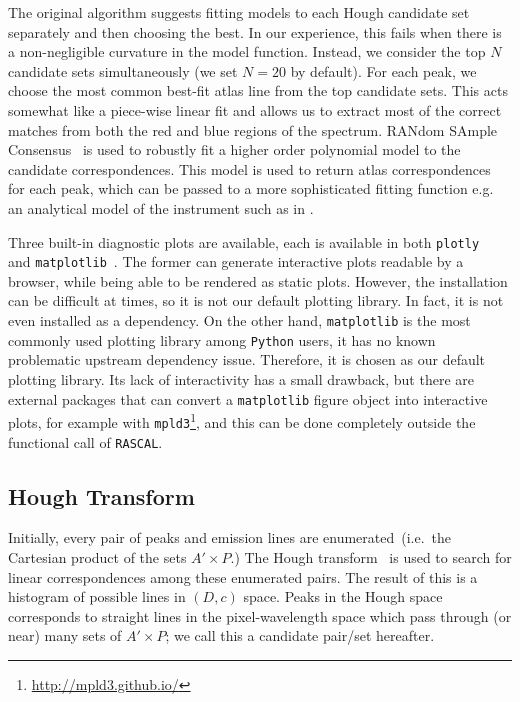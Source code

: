 \documentclass{aa}
\begin{document}
The original algorithm suggests fitting models to each Hough candidate set separately
and then choosing the best. In our experience, this fails when there is a non-negligible
curvature in the model function. Instead, we consider the top $N$ candidate sets
simultaneously (we set $N = 20$ by default). For each peak, we choose the most common
best-fit atlas line from the top candidate sets. This acts somewhat like a piece-wise
linear fit and allows us to extract most of the correct matches from both the red and
blue regions of the spectrum. RANdom SAmple
Consensus~\citep[RANSAC][]{fischler_bolles_1981} is used to robustly fit
a higher order polynomial model to the candidate correspondences. This model is used
to return atlas correspondences for each peak, which can be passed to a more
sophisticated fitting function e.g. an analytical model of the instrument such as
in \citet{2013OptEn..52a3603L}.

Three built-in diagnostic plots are available, each is available in both
\texttt{plotly}~\citep{plotly} and \texttt{matplotlib}~\citep{Hunter:2007, thomas_a_caswell_2021_4743323}. The former can generate interactive plots
readable by a browser, while being able to be rendered as static plots. However,
the installation can be difficult at times, so it is not our default plotting
library. In fact, it is not even installed as a dependency. On the other hand,
\texttt{matplotlib} is the most commonly used plotting library
among \texttt{Python} users, it has no known problematic upstream dependency issue.
Therefore, it is chosen as our default plotting library. Its lack of
interactivity has a small drawback, but there are external packages that can
convert a \texttt{matplotlib} figure object into interactive plots, for example
with \texttt{mpld3}\footnote{\url{http://mpld3.github.io/}}, and this can be done
completely outside the functional call of \texttt{RASCAL}.

\subsection{Hough Transform}
Initially, every pair of peaks and emission lines are enumerated~(i.e.\ the
Cartesian product of the sets $A' \times P$.) The Hough
transform~\citep{osti_4746348} is used to search for linear correspondences
among these enumerated pairs. The result of this is a histogram of possible lines
in $(D, c)$ space. Peaks in the Hough space corresponds to straight lines
in the pixel-wavelength space which pass through (or near) many sets of
$A' \times P$; we call this a candidate pair/set hereafter.
\end{document}
